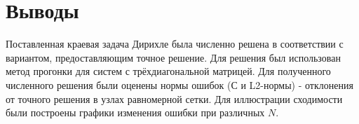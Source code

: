 \documentclass[a4paper,12pt,titlepage,final]{article}
\begin{document}
\section{Выводы}
Поставленная краевая задача Дирихле была численно решена в соответствии с вариантом, предоставляющим точное решение. Для решения был использован метод прогонки для систем с трёхдиагональной матрицей. Для полученного численного решения были оценены нормы ошибок (С и L2-нормы) - отклонения от точного решения в узлах равномерной сетки. Для иллюстрации сходимости были построены графики изменения ошибки при различных $N$.
\end{document}
